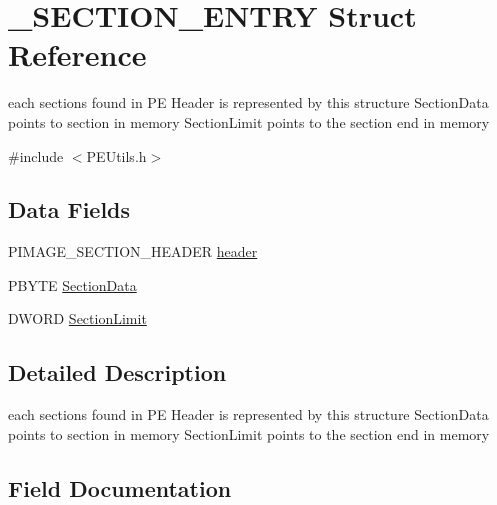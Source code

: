 \hypertarget{struct___s_e_c_t_i_o_n___e_n_t_r_y}{}\section{\+\_\+\+S\+E\+C\+T\+I\+O\+N\+\_\+\+E\+N\+T\+RY Struct Reference}
\label{struct___s_e_c_t_i_o_n___e_n_t_r_y}


each sections found in PE Header is represented by this structure Section\+Data points to section in memory Section\+Limit points to the section end in memory  




{\ttfamily \#include $<$P\+E\+Utils.\+h$>$}

\subsection*{Data Fields}
\begin{DoxyCompactItemize}
\item 
P\+I\+M\+A\+G\+E\+\_\+\+S\+E\+C\+T\+I\+O\+N\+\_\+\+H\+E\+A\+D\+ER \mbox{\hyperlink{struct___s_e_c_t_i_o_n___e_n_t_r_y_aeef6195dc1ba3eef5015d2d0d8ac0dea}{header}}
\item 
P\+B\+Y\+TE \mbox{\hyperlink{struct___s_e_c_t_i_o_n___e_n_t_r_y_a4989da4c47a774fc01eddcbb705c2b5d}{Section\+Data}}
\item 
D\+W\+O\+RD \mbox{\hyperlink{struct___s_e_c_t_i_o_n___e_n_t_r_y_abc3b0ce3e4b4127063dbfbe99c6e1d5b}{Section\+Limit}}
\end{DoxyCompactItemize}


\subsection{Detailed Description}
each sections found in PE Header is represented by this structure Section\+Data points to section in memory Section\+Limit points to the section end in memory 

\subsection{Field Documentation}
\mbox{\label{struct___s_e_c_t_i_o_n___e_n_t_r_y_aeef6195dc1ba3eef5015d2d0d8ac0dea}} 
